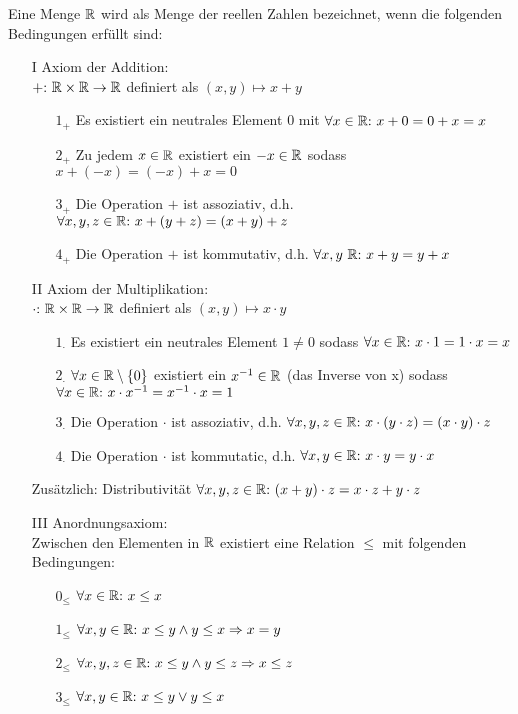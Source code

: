 
	Eine Menge $\mathbb{R}$ wird als Menge der reellen Zahlen bezeichnet, wenn die folgenden Bedingungen erfüllt sind:
	
	\begin{enumerate}
		
		\item[I] Axiom der Addition:\\
		$+{:}\  \mathbb{R} \times \mathbb{R} \to \mathbb{R}$ definiert als $(x, y) \mapsto x+y$
		\begin{enumerate}
			\item [$1_+$] Es existiert ein neutrales Element $0$ mit $\forall x \in \mathbb{R}{:}\  x + 0 = 0 + x = x$
			\item [$2_+$] Zu jedem $x \in \mathbb{R}$ existiert ein $-x \in \mathbb{R}$ sodass $x + (-x) = (-x) + x = 0$
			\item [$3_+$] Die Operation $+$ ist assoziativ, d.h. $\forall x,y,z \in \mathbb{R}{:}\  x+(y+z) = (x+y)+z$
			\item [$4_+$] Die Operation $+$ ist kommutativ, d.h. $\forall x,y \ \mathbb{R}{:}\  x + y = y + x$
		\end{enumerate}
	
		\item [II] Axiom der Multiplikation:\\
		$\cdot{:}\  \mathbb{R} \times \mathbb{R} \to \mathbb{R}$ definiert als $(x,y) \mapsto x\cdot y$
		\begin{enumerate}
			\item [$1_\cdot$] Es existiert ein neutrales Element $1\neq 0$ sodass $\forall x \in \mathbb{R}{:}\  x\cdot 1 = 1 \cdot x = x$
			\item [$2_\cdot$] $\forall x \in \mathbb{R} \setminus \{0\}$ existiert ein $x^{-1} \in \mathbb{R}$ (das Inverse von x) sodass \newline $\forall x \in \mathbb{R}{:}\  x \cdot x^{-1} = x ^ {-1} \cdot x = 1$
			\item [$3_\cdot$] Die Operation $\cdot$ ist assoziativ, d.h. $\forall x,y,z \in \mathbb{R}{:}\  x\cdot (y\cdot z) = (x\cdot y) \cdot z$
			\item [$4_\cdot$] Die Operation $\cdot$ ist kommutatic, d.h. $\forall x,y \in \mathbb{R}{:}\  x\cdot y = y\cdot x$
		\end{enumerate}
	
		\item[ ] Zusätzlich: Distributivität $\forall x,y,z \in \mathbb{R}{:}\  (x+y) \cdot z = x\cdot z + y\cdot z$
		
		\item [III] Anordnungsaxiom:\\
		Zwischen den Elementen in $\mathbb{R}$ existiert eine Relation $\leq$ mit folgenden Bedingungen:
		\begin{enumerate}
			\item [$0_\leq$] $\forall x \in \mathbb{R}{:}\  x \leq x$
			\item [$1_\leq$] $\forall x,y \in \mathbb{R}{:}\  x \leq y \land y \leq x \Rightarrow x = y$
			\item [$2_\leq$] $\forall x,y,z \in \mathbb{R}{:}\  x \leq y \land y \leq z \Rightarrow x \leq z$
			\item [$3_\leq$] $\forall x,y \in \mathbb{R}{:}\  x \leq y \lor y \leq x$
		\end{enumerate}
	

\end{enumerate}
